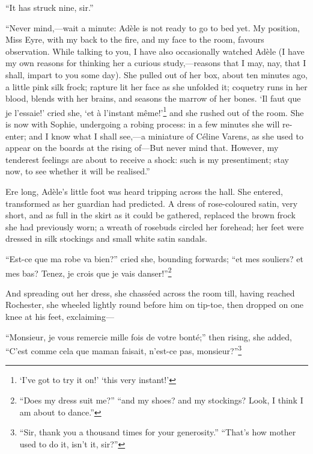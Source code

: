 \enquote{It has struck nine, sir.}

\enquote{Never mind,---wait a minute: Adèle is not ready to go to bed
yet. My position, Miss Eyre, with my back to the fire, and my face to
the room, favours observation. While talking to you, I have also
occasionally watched Adèle (I have my own reasons for thinking her a
curious study,---reasons that I may, nay, that I shall, impart to you
some day). She pulled out of her box, about ten minutes ago, a little
pink silk frock; rapture lit her face as she unfolded it; coquetry runs
in her blood, blends with her brains, and seasons the marrow of her
bones. \foreignquote{french}{Il faut que je l'essaie!} cried she, \foreignquote{french}{et à
l'instant même!}\footnote{\enquote{I've got to try it on!} \textelp{} \enquote{this very instant!}} 
and she rushed out of the room. She is now with
Sophie, undergoing a robing process: in a few minutes she will re-enter;
and I know what I shall see,---a miniature of Céline Varens, as she used
to appear on the boards at the rising of---But never mind that. 
However, my tenderest feelings are about to receive a shock: such is my
presentiment; stay now, to see whether it will be realised.}

Ere long, Adèle's little foot was heard tripping across the hall. She
entered, transformed as her guardian had predicted. A dress of
rose-coloured satin, very short, and as full in the skirt as it could be
gathered, replaced the brown frock she had previously worn; a wreath of
rosebuds circled her forehead; her feet were dressed in silk stockings
and small white satin sandals.

\foreignquote{french}{Est-ce que ma robe va bien?} cried she, bounding forwards;
\foreignquote{french}{et mes souliers? et mes bas? Tenez, je crois que je vais
danser!}\footnote{\enquote{Does my dress suit me?} \textelp{} \enquote{and my shoes?
and my stockings? Look, I think I am about to dance.}}

And spreading out her dress, she chasséed across the room till, having
reached \Mr{} Rochester, she wheeled lightly round before him on tip-toe,
then dropped on one knee at his feet, exclaiming---

\foreignquote{french}{Monsieur, je vous remercie mille fois de votre bonté;} then
rising, she added, \foreignquote{french}{C'est comme cela que maman faisait, n'est-ce
pas, monsieur?}\footnote{\enquote{Sir, thank you a thousand times for your generosity.} 
\textelp{} \enquote{That's how mother used to do it, isn't it, sir?}}

